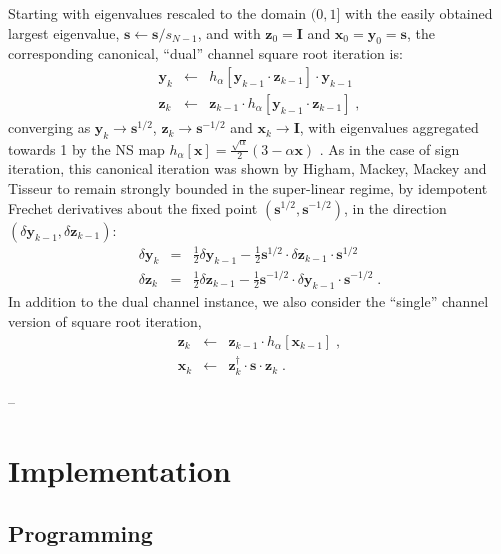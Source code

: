 \documentclass[letterpaper,twocolumn,amsmath,amsfont,amssymb,english,aps,jcp,preprintnumbers,groupaddress,nofootinbib,tightenlines,floatfix]{revtex4}
\newcommand{\mat}[1]{\boldsymbol{#1}}
\theoremstyle{plain}
\theoremstyle{remark}
\theoremstyle{plain}
\begin{document}
Starting with eigenvalues rescaled to the domain $(0,1]$ with the easily obtained 
largest eigenvalue,   $\mat{s} \leftarrow \mat{s}/s_{N-1}$, and with $\mat{z}_0=\mat{I}$ and 
$\mat{x}_0=\mat{y}_0=\mat{s}$, the corresponding canonical,  ``dual'' channel square root iteration is:
\begin{eqnarray}\label{cannonical}
\mat{y}_k &\leftarrow& h_\alpha \left[ \mat{y}_{k-1} \cdot \mat{z}_{k-1} \right] \cdot \mat{y}_{k-1}  \nonumber \\
\mat{z}_k &\leftarrow& \mat{z}_{k-1} \cdot h_\alpha \left[ \mat{y}_{k-1} \cdot \mat{z}_{k-1} \right] \; ,
\end{eqnarray}
converging as ${\mat{y}}_k \rightarrow \mat{s}^{1/2}$, ${\mat{z}}_k \rightarrow \mat{s}^{-1/2}$ and
${\mat{x}}_k \rightarrow {\mat{I}}$, with eigenvalues aggregated towards 1 by 
the NS map $h_\alpha[\mat{x}]=\frac{\sqrt{\alpha}}{2} \left(3-\alpha \mat{x} \right)$ \cite{Higham08,higham2005}.  
As in the case of sign iteration, this canonical iteration was shown by Higham, Mackey, Mackey and
Tisseur \cite{higham2005} to remain strongly bounded in the super-linear regime, by idempotent Frechet derivatives about the fixed point
$\left(\mat{s}^{1/2},\mat{s}^{-1/2}\right)$, in the direction $\left(
\delta \mat{y}_{k-1} , \delta \mat{z}_{k-1} \right)$:
\begin{eqnarray}
\delta \mat{y}_k &=& \frac{1}{2} \delta \mat{y}_{k-1} - \frac{1}{2} \mat{s}^{1/2} \cdot \delta \mat{z}_{k-1} \cdot \mat{s}^{1/2} \\
\delta \mat{z}_k &=& \frac{1}{2} \delta \mat{z}_{k-1} - \frac{1}{2} \mat{s}^{-1/2} \cdot \delta \mat{y}_{k-1} \cdot \mat{s}^{-1/2} \;.
\end{eqnarray}
In addition to the dual channel instance, we also consider the ``single'' channel version of square root iteration,
\begin{eqnarray}\label{single}
\mat{z}_k &\leftarrow& \mat{z}_{k-1} \cdot h_\alpha \left[ \mat{x}_{k-1} \right] \; , \nonumber \\
\mat{x}_k &\leftarrow&  \mat{z}^\dagger_{k} \cdot \mat{s} \cdot \mat{z}_{k} \; .
\end{eqnarray}

\pagebreak
--
\pagebreak

\section{Implementation}

\subsection{Programming}
\end{document}
